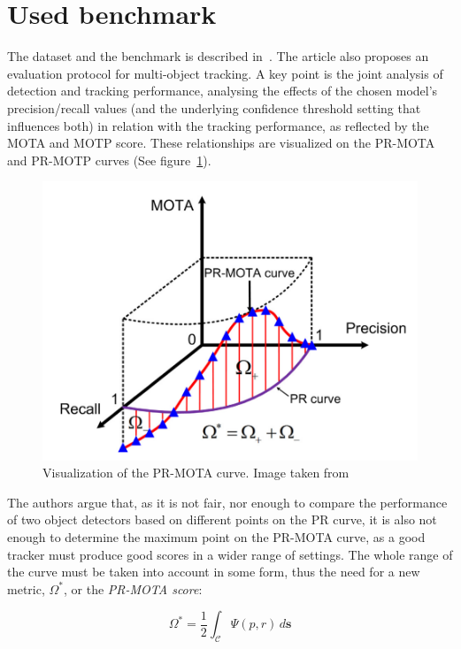 \section{Used benchmark}

The dataset and the benchmark is described in~\cite{CVIU_UA-DETRAC}. The article also proposes an evaluation protocol for multi-object tracking. A key point is the joint analysis of detection and tracking performance, analysing the effects of the chosen model's precision/recall values (and the underlying confidence threshold setting that influences both) in relation with the tracking performance, as reflected by the MOTA and MOTP score. These relationships are visualized on the PR-MOTA and PR-MOTP curves (See figure~\ref{fig:pr-mota}).

\begin{figure}[h]
    \captionsetup{width=\textwidth}
    \includegraphics[width=\textwidth]{figures/pr-mota-curve.png}
    \caption{Visualization of the PR-MOTA curve. Image taken from \cite{CVIU_UA-DETRAC}}
    \label{fig:pr-mota}
\end{figure}

The authors argue that, as it is not fair, nor enough to compare the performance of two object detectors based on different points on the PR curve, it is also not enough to determine the maximum point on the PR-MOTA curve, as a good tracker must produce good scores in a wider range of settings. The whole range of the curve must be taken into account in some form, thus the need for a new metric, $\Omega^{*}$, or the \textit{PR-MOTA score}:

\[ \Omega^{*} = \frac{1}{2}\int_{\mathcal{C}} \Psi(p, r) \,d\textbf{s} \]

